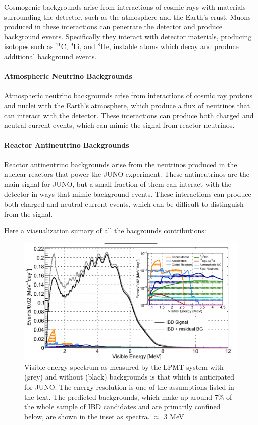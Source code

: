 Cosmogenic backgrounds arise from interactions of cosmic rays with materials surrounding the detector, such as the atmosphere and the Earth's crust. Muons produced in these interactions can penetrate the detector and produce background events. Specifically they interact with detector materials, producing isotopes such as $^{11}\mathrm{C}$, $^{9}\mathrm{Li}$, and $^{8}\mathrm{He}$, instable atoms which decay and produce additional background events.

\paragraph{Atmospheric Neutrino Backgrounds}

Atmospheric neutrino backgrounds arise from interactions of cosmic ray protons and nuclei with the Earth's atmosphere, which produce a flux of neutrinos that can interact with the detector. These interactions can produce both charged and neutral current events, which can mimic the signal from reactor neutrinos.

\paragraph{Reactor Antineutrino Backgrounds}

Reactor antineutrino backgrounds arise from the neutrinos produced in the nuclear reactors that power the JUNO experiment. These antineutrinos are the main signal for JUNO, but a small fraction of them can interact with the detector in ways that mimic background events. These interactions can produce both charged and neutral current events, which can be difficult to distinguish from the signal.


Here a viasualization sumary of all the bacgrounds contributions:

\begin{figure}[h]
	\centering
	\includegraphics[width=0.7\linewidth]{Images/backgrounds_spectrum}
	\caption{Visible energy spectrum as measured by the LPMT system with (grey) and without (black) backgrounds is that which is anticipated for JUNO. The energy resolution is one of the assumptions listed in the text. The predicted backgrounds, which make up around 7$\%$ of the whole sample of IBD candidates and are primarily confined below, are shown in the inset as spectra. $\approx$ 3 MeV}
	\label{fig:backgroundsspectrum}
\end{figure}
